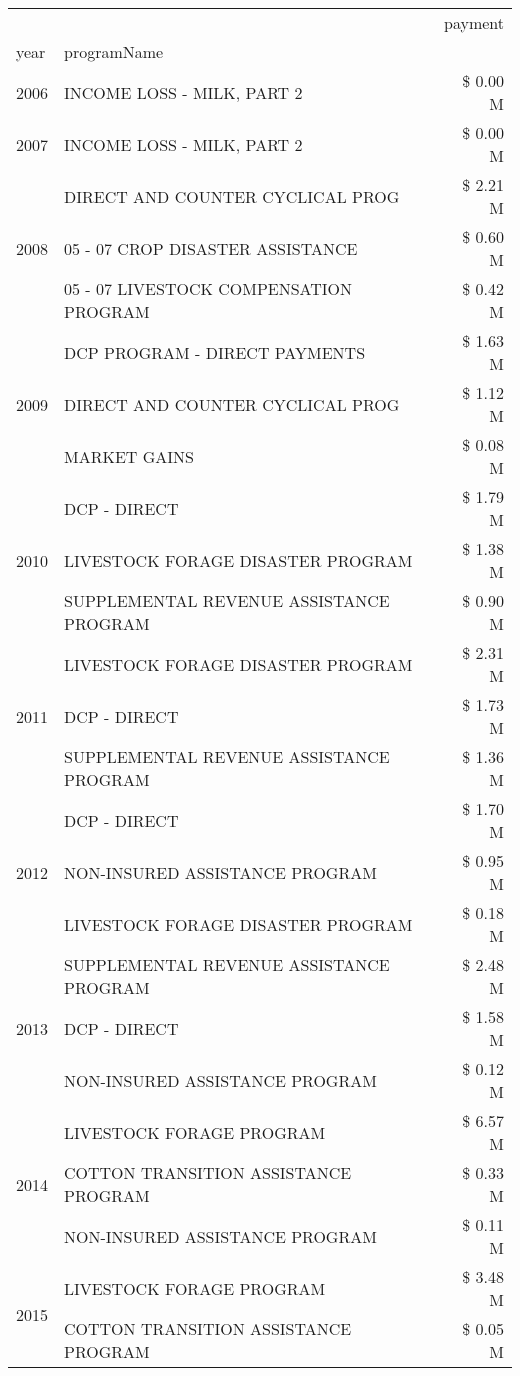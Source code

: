\begin{tabular}{llr}
\toprule
 &  & payment \\
year & programName &  \\
\midrule
2006 & INCOME LOSS - MILK, PART 2 & \$ 0.00 M \\
\cline{1-3}
2007 & INCOME LOSS - MILK, PART 2 & \$ 0.00 M \\
\cline{1-3}
\multirow[t]{3}{*}{2008} & DIRECT AND COUNTER CYCLICAL PROG & \$ 2.21 M \\
 & 05 - 07 CROP DISASTER ASSISTANCE & \$ 0.60 M \\
 & 05 - 07 LIVESTOCK COMPENSATION PROGRAM & \$ 0.42 M \\
\cline{1-3}
\multirow[t]{3}{*}{2009} & DCP PROGRAM - DIRECT PAYMENTS & \$ 1.63 M \\
 & DIRECT AND COUNTER CYCLICAL PROG & \$ 1.12 M \\
 & MARKET GAINS & \$ 0.08 M \\
\cline{1-3}
\multirow[t]{3}{*}{2010} & DCP - DIRECT & \$ 1.79 M \\
 & LIVESTOCK FORAGE DISASTER PROGRAM & \$ 1.38 M \\
 & SUPPLEMENTAL REVENUE ASSISTANCE PROGRAM & \$ 0.90 M \\
\cline{1-3}
\multirow[t]{3}{*}{2011} & LIVESTOCK FORAGE DISASTER PROGRAM & \$ 2.31 M \\
 & DCP - DIRECT & \$ 1.73 M \\
 & SUPPLEMENTAL REVENUE ASSISTANCE PROGRAM & \$ 1.36 M \\
\cline{1-3}
\multirow[t]{3}{*}{2012} & DCP - DIRECT & \$ 1.70 M \\
 & NON-INSURED ASSISTANCE PROGRAM & \$ 0.95 M \\
 & LIVESTOCK FORAGE DISASTER PROGRAM & \$ 0.18 M \\
\cline{1-3}
\multirow[t]{3}{*}{2013} & SUPPLEMENTAL REVENUE ASSISTANCE PROGRAM & \$ 2.48 M \\
 & DCP - DIRECT & \$ 1.58 M \\
 & NON-INSURED ASSISTANCE PROGRAM & \$ 0.12 M \\
\cline{1-3}
\multirow[t]{3}{*}{2014} & LIVESTOCK FORAGE PROGRAM & \$ 6.57 M \\
 & COTTON TRANSITION ASSISTANCE PROGRAM & \$ 0.33 M \\
 & NON-INSURED ASSISTANCE PROGRAM & \$ 0.11 M \\
\cline{1-3}
\multirow[t]{3}{*}{2015} & LIVESTOCK FORAGE PROGRAM & \$ 3.48 M \\
 & COTTON TRANSITION ASSISTANCE PROGRAM & \$ 0.05 M \\

\end{tabular}
